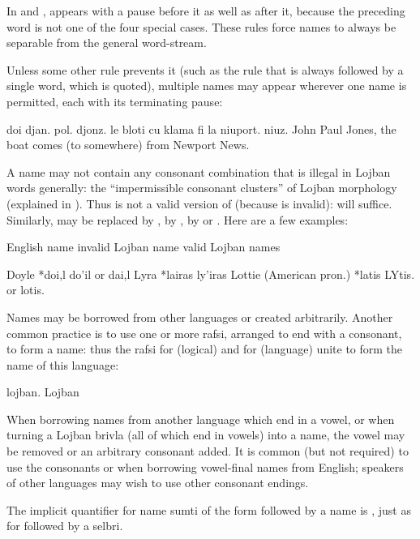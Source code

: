 In  and ,  appears with a pause
    before it as well as after it, because the preceding word is
    not one of the four special cases. These rules force names to
    always be separable from the general word-stream.

Unless some other rule prevents it (such as the rule that
     is always followed by a single word, which is quoted),
    multiple names may appear wherever one name is permitted, each
    with its terminating pause:
\begin{example}
doi djan. pol. djonz.\n
\T	le bloti cu klama fi la niuport. niuz.\n
John Paul Jones,\n
\T	the boat comes (to somewhere) from Newport News.
\end{example}

A name may not contain any consonant combination that is
    illegal in Lojban words generally: the ``impermissible
    consonant clusters'' of Lojban morphology (explained in ). Thus  is not a
    valid version of  (because  is invalid):
     will suffice. Similarly,  may be replaced by
    ,  by ,  by  or .
    Here are a few examples: 

   English name        invalid Lojban name valid Lojban names

   Doyle           *doi,l          do'il or dai,l
    Lyra            *lairas         ly'iras
    Lottie (American pron.) *latis          LYtis. or lotis.

Names may be borrowed from other languages or created
    arbitrarily. Another common practice is to use one or more
    rafsi, arranged to end with a consonant, to form a name: thus
    the rafsi  for  (logical) and  for
     (language) unite to form the name of this language:
\begin{example}
lojban.\n
Lojban
\end{example}

When borrowing names from another language which end in a
    vowel, or when turning a Lojban brivla (all of which end in
    vowels) into a name, the vowel may be removed or an arbitrary
    consonant added. It is common (but not required) to use the
    consonants  or  when borrowing vowel-final names from
    English; speakers of other languages may wish to use other
    consonant endings. 

The implicit quantifier for name sumti of the form 
    followed by a name is , just as for  followed by
    a selbri.



